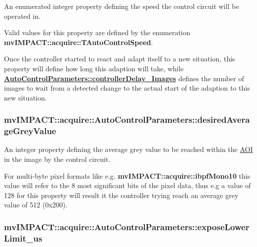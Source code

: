An enumerated integer property defining the speed the control circuit will be operated in. 

Valid values for this property are defined by the enumeration {\bfseries mv\+I\+M\+P\+A\+C\+T\+::acquire\+::\+T\+Auto\+Control\+Speed}.

Once the controller started to react and adapt itself to a new situation, this property will define how long this adaption will take, while {\bfseries \hyperlink{classmv_i_m_p_a_c_t_1_1acquire_1_1_auto_control_parameters_a3407e03e305679114b266795ad777235}{Auto\+Control\+Parameters\+::controller\+Delay\+\_\+\+Images}} defines the number of images to wait from a detected change to the actual start of the adaption to this new situation. \hypertarget{classmv_i_m_p_a_c_t_1_1acquire_1_1_auto_control_parameters_a91ac507b9c8d022db1f05eda5b6c9404}{
\subsubsection[{desired\+Average\+Grey\+Value}]{ mv\+I\+M\+P\+A\+C\+T\+::acquire\+::\+Auto\+Control\+Parameters\+::desired\+Average\+Grey\+Value}}\label{classmv_i_m_p_a_c_t_1_1acquire_1_1_auto_control_parameters_a91ac507b9c8d022db1f05eda5b6c9404}


An integer property defining the average grey value to be reached within the \hyperlink{struct_a_o_i}{A\+O\+I} in the image by the control circuit. 

For multi-\/byte pixel formats like e.\+g. {\bfseries mv\+I\+M\+P\+A\+C\+T\+::acquire\+::ibpf\+Mono10} this value will refer to the 8 most significant bits of the pixel data, thus e.\+g a value of 128 for this property will result it the controller trying reach an average grey value of 512 (0x200). \hypertarget{classmv_i_m_p_a_c_t_1_1acquire_1_1_auto_control_parameters_a0735b2bc3ada211f34ff924e2b9123b7}{
\subsubsection[{expose\+Lower\+Limit\+\_\+us}]{ mv\+I\+M\+P\+A\+C\+T\+::acquire\+::\+Auto\+Control\+Parameters\+::expose\+Lower\+Limit\+\_\+us}}\label{classmv_i_m_p_a_c_t_1_1acquire_1_1_auto_control_parameters_a0735b2bc3ada211f34ff924e2b9123b7}


